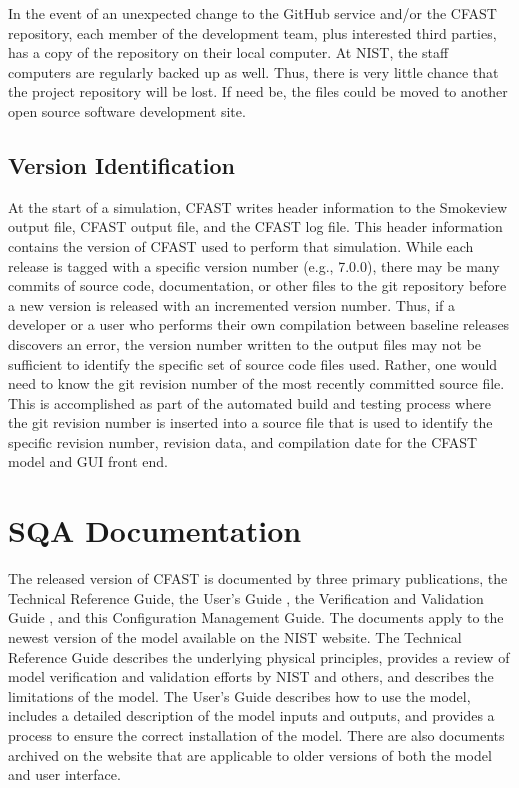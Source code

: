 \documentclass[12pt]{book}
\begin{document}
In the event of an unexpected change to the GitHub service and/or the CFAST repository, each member of the development team, plus interested third parties, has a copy of the repository on their local computer. At NIST, the staff computers are regularly backed up as well. Thus, there is very little chance that the project repository will be lost. If need be, the files could be moved to another open source software development site.

\section{Version Identification}

At the start of a simulation, CFAST writes header information to the Smokeview output file, CFAST output file, and the CFAST log file.  This header information contains the version of CFAST used to perform that simulation. While each release is tagged with a specific version number (e.g., 7.0.0), there may be many commits of source code, documentation, or other files to the git repository before a new version is released with an incremented version number.  Thus, if a developer or a user who performs their own compilation between baseline releases discovers an error, the version number written to the output files may not be sufficient to identify the specific set of source code files used.  Rather, one would need to know the git revision number of the most recently committed source file. This is accomplished as part of the automated build and testing process where the git revision number is inserted into a source file that is used to identify the specific revision number, revision data, and compilation date for the CFAST model and GUI front end.


\chapter{SQA Documentation}

The released version of CFAST is documented by three primary publications, the Technical Reference Guide\cite{CFAST_Tech_Guide_7}, the User's Guide \cite{CFAST_Users_Guide_7}, the Verification and Validation Guide \cite{CFAST_Valid_Guide_7}, and this Configuration Management Guide. The documents apply to the newest version of the model available on the NIST website. The Technical Reference Guide describes the underlying physical principles, provides a review of model verification and validation efforts by NIST and others, and describes the limitations of the model.  The User's Guide describes how to use the model, includes a detailed description of the model inputs and outputs, and provides a process to ensure the correct installation of the model. There are also documents archived on the website that are applicable to older versions of both the model and user interface.
\end{document}
